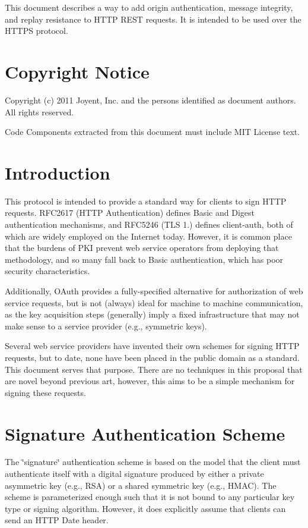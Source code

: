 This document describes a way to add origin authentication, message integrity, and replay resistance to H\+T\+T\+P R\+E\+S\+T requests. It is intended to be used over the H\+T\+T\+P\+S protocol.

\section*{Copyright Notice}

Copyright (c) 2011 Joyent, Inc. and the persons identified as document authors. All rights reserved.

Code Components extracted from this document must include M\+I\+T License text.

\section*{Introduction}

This protocol is intended to provide a standard way for clients to sign H\+T\+T\+P requests. R\+F\+C2617 (H\+T\+T\+P Authentication) defines Basic and Digest authentication mechanisms, and R\+F\+C5246 (T\+L\+S 1.) defines client-\/auth, both of which are widely employed on the Internet today. However, it is common place that the burdens of P\+K\+I prevent web service operators from deploying that methodology, and so many fall back to Basic authentication, which has poor security characteristics.

Additionally, O\+Auth provides a fully-\/specified alternative for authorization of web service requests, but is not (always) ideal for machine to machine communication, as the key acquisition steps (generally) imply a fixed infrastructure that may not make sense to a service provider (e.\+g., symmetric keys).

Several web service providers have invented their own schemes for signing H\+T\+T\+P requests, but to date, none have been placed in the public domain as a standard. This document serves that purpose. There are no techniques in this proposal that are novel beyond previous art, however, this aims to be a simple mechanism for signing these requests.

\section*{Signature Authentication Scheme}

The \char`\"{}signature\char`\"{} authentication scheme is based on the model that the client must authenticate itself with a digital signature produced by either a private asymmetric key (e.\+g., R\+S\+A) or a shared symmetric key (e.\+g., H\+M\+A\+C). The scheme is parameterized enough such that it is not bound to any particular key type or signing algorithm. However, it does explicitly assume that clients can send an H\+T\+T\+P {\ttfamily Date} header.

